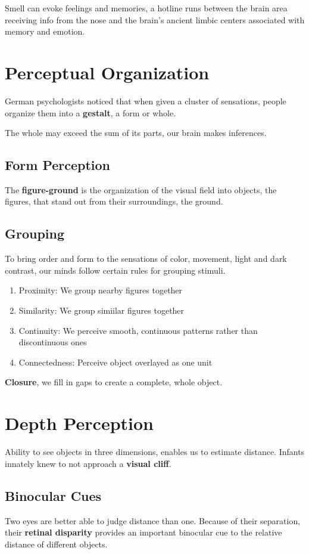 \documentclass[12pt]{article}
\begin{document}
Smell can evoke feelings and memories, a hotline runs between the brain area receiving info from the nose and the brain's ancient limbic centers associated with memory and emotion. 

\section*{Perceptual Organization}
German psychologists noticed that when given a cluster of sensations, people organize them into a \textbf{gestalt}, a form or whole.

The whole may exceed the sum of its parts, our brain makes inferences.

\subsection*{Form Perception}
The \textbf{figure-ground} is the organization of the visual field into objects, the figures, that stand out from their surroundings, the ground.

\subsection*{Grouping}
To bring order and form to the sensations of color, movement, light and dark contrast, our minds follow certain rules for grouping stimuli.

\begin{enumerate}
  \item Proximity: We group nearby figures together
  \item Similarity: We group simiilar figures together
  \item Continuity: We perceive smooth, continuous patterns rather than discontinuous ones
  \item Connectedness: Perceive object overlayed as one unit
\end{enumerate}

\textbf{Closure}, we fill in gaps to create a complete, whole object.

\section*{Depth Perception}
Ability to see objects in three dimensions, enables us to estimate distance. Infants innately knew to not approach a \textbf{visual cliff}. 

\subsection*{Binocular Cues}
Two eyes are better able to judge distance than one. Because of their separation, their \textbf{retinal disparity} provides an important binocular cue to the relative distance of different objects.
\end{document}
